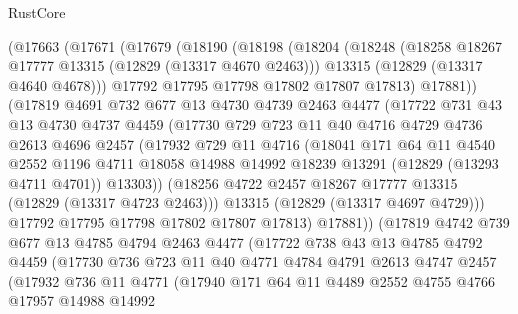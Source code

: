 \begin{lexlean}{RustCore}
\begin{coremodule}
    (@17663
      (@17671
        (@17679
          (@18190
            (@18198
              (@18204
                (@18248
                  (@18258 @18267 @17777 @13315 (@12829 (@13317 @4670 @2463)))
                  @13315
                  (@12829 (@13317 @4640 @4678)))
                @17792
                @17795
                @17798
                @17802
                @17807
                @17813)
              @17881))
          (@17819
            @4691
            @732
            @677
            @13
            @4730
            @4739
            @2463
            @4477
            (@17722
              @731
              @43
              @13
              @4730
              @4737
              @4459
              (@17730
                @729
                @723
                @11
                @40
                @4716
                @4729
                @4736
                @2613
                @4696
                @2457
                (@17932
                  @729
                  @11
                  @4716
                  (@18041
                    @171
                    @64
                    @11
                    @4540
                    @2552
                    @1196
                    @4711
                    @18058
                    @14988
                    @14992
                    @18239
                    @13291
                    (@12829 (@13293 @4711 @4701))
                    @13303))
                (@18256 @4722 @2457 @18267 @17777 @13315 (@12829 (@13317 @4723 @2463)))
                @13315
                (@12829 (@13317 @4697 @4729)))
              @17792
              @17795
              @17798
              @17802
              @17807
              @17813)
            @17881))
        (@17819
          @4742
          @739
          @677
          @13
          @4785
          @4794
          @2463
          @4477
          (@17722
            @738
            @43
            @13
            @4785
            @4792
            @4459
            (@17730
              @736
              @723
              @11
              @40
              @4771
              @4784
              @4791
              @2613
              @4747
              @2457
              (@17932
                @736
                @11
                @4771
                (@17940
                  @171
                  @64
                  @11
                  @4489
                  @2552
                  @4755
                  @4766
                  @17957
                  @14988
                  @14992

\end{coremodule}
\end{lexlean}
